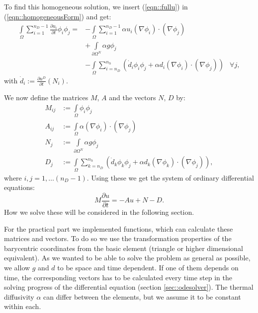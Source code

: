 To find this homogeneous solution, we insert (\ref{eqn::fullu}) in (\ref{eqn::homogeneousForm}) and get:
\begin{equation}
\label{eqn::finalDiscreticedForm}
\begin{aligned}
        \int\limits_{\Omega} \sum_{i=1}^{n_D-1} \frac{\partial u_i}{\partial t} \phi_i \phi_j = &-\int\limits_{\Omega} \sum_{i=1}^{n_D-1} \alpha u_i(\nabla \phi_i) \cdot (\nabla \phi_j) \\
        &+ \int\limits_{\partial\Omega^N} \alpha g\phi_j \\
        &-        \int\limits_{\Omega} \sum_{i=n_D}^{n_h}\left( \dot{d}_i \phi_i \phi_j  + \alpha d_i(\nabla \phi_i) \cdot (\nabla \phi_j)\right)
         & \forall j,
\end{aligned}
\end{equation}
with $\dot{d}_i:=\frac{\partial u^D}{\partial t}(N_i)$.

We now define the matrices $M$, $A$ and the vectors $N$, $D$ by:
\begin{align*}
        M_{ij} &:=\int\limits_{\Omega} \phi_i \phi_j \\
        A_{ij} &:=\int\limits_{\Omega} \alpha (\nabla \phi_i) \cdot (\nabla \phi_j) \\
        N_{j} &:=\int\limits_{\partial\Omega^N} \alpha g\phi_j \\
        D_{j} &:=\int\limits_{\Omega} \sum_{k=n_D}^{n_h}\left( \dot{d}_k \phi_k \phi_j  + \alpha d_k(\nabla \phi_k) \cdot (\nabla \phi_j)\right),
\end{align*}
where $i,j=1,\dots (n_D-1)$. Using these we get the system of ordinary differential equations:
\begin{equation}
        \label{eqn::matrixForm}
        M\frac{\partial u}{\partial t} = -A u + N - D.
\end{equation}
How we solve these will be considered in the following section.

For the practical part we implemented functions, which can calculate these matrices and vectors. To do so we use the transformation properties of the barycentric coordinates from the basic element (triangle or higher dimensional equivalent). As we wanted to be able to solve the problem as general as possible, we allow $g$ and $d$ to be space and time dependent. If one of them depends on time, the corresponding vectors has to be calculated every time step in the solving progress of the differential equation (section \ref{sec::odesolver}). The thermal diffusivity $\alpha$ can differ between the elements, but we assume it to be constant within each.